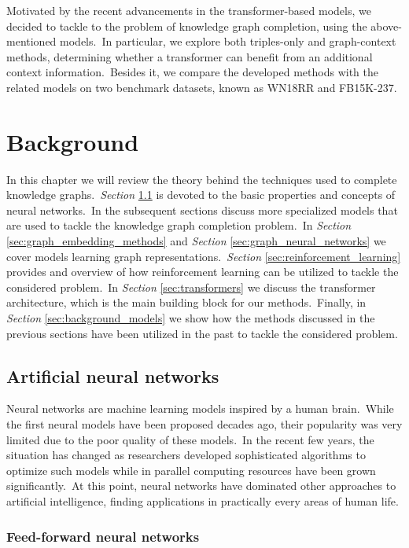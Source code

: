 \documentclass[longabstract, english, mgr]{iithesis}
\newcommand\numberedchapter[1]{\setlength\topskip{3cm}\chapter{#1}\setlength\topskip{0cm}}
\theoremstyle{default_theorem_style}\newtheorem{theorem}{Theorem}
\theoremstyle{default_theorem_style}\newtheorem{definition}{Definition}
\begin{document}
\noindent Motivated by the recent advancements in the transformer-based models, we decided to tackle to the problem
of knowledge graph completion, using the above-mentioned models.\ In particular, we explore both
triples-only and graph-context methods, determining whether a transformer can benefit from an additional context
information.\ Besides it, we compare the developed methods with the related models on two benchmark datasets, known
as WN18RR and FB15K-237.

\numberedchapter{Background}\label{chapter:background}

In this chapter we will review the theory behind the techniques used to complete knowledge
graphs.\ \textit{Section} \ref{sec:neural_networks}
is devoted to the basic properties and concepts of neural networks.\ In the subsequent sections discuss more
specialized models that are used to tackle the knowledge graph completion problem.\ In
\textit{Section} \ref{sec:graph_embedding_methods} and \textit{Section} \ref{sec:graph_neural_networks} we cover
models learning graph representations.\ \textit{Section} \ref{sec:reinforcement_learning} provides and overview of
how reinforcement learning can be utilized to tackle the considered problem.\ In \textit{Section}
\ref{sec:transformers} we discuss the transformer architecture, which is the main building block for our
methods.\ Finally, in \textit{Section} \ref{sec:background_models} we show how the methods discussed in the previous
sections have been utilized in the past to tackle the considered problem.

\section{Artificial neural networks}\label{sec:neural_networks}

Neural networks are machine learning models inspired by a human brain.\ While the first neural models have
been proposed decades ago, their popularity was very limited due to the poor quality of these models.\ In the recent
few years, the situation has changed as researchers developed sophisticated algorithms to optimize such models while
in parallel computing resources have been grown significantly.\ At this point, neural networks have dominated other
approaches to artificial intelligence, finding applications in practically every areas of human life.

\subsection{Feed-forward neural networks}\label{subsec:feed_forward}
\end{document}

